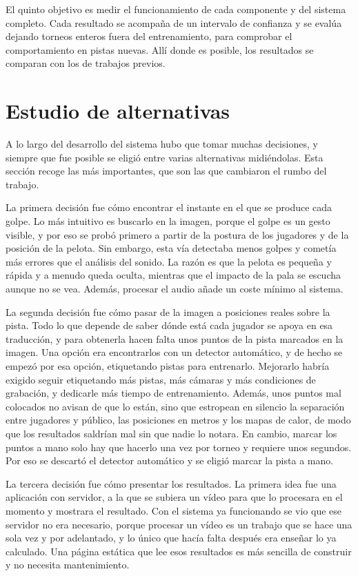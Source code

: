 El quinto objetivo es medir el funcionamiento de cada componente y del sistema completo.
Cada resultado se acompaña de un intervalo de confianza y se evalúa dejando torneos enteros fuera del entrenamiento, para comprobar el comportamiento en pistas nuevas.
Allí donde es posible, los resultados se comparan con los de trabajos previos.

\section{Estudio de alternativas}
\label{sec:alternativas}



A lo largo del desarrollo del sistema hubo que tomar muchas decisiones, y siempre que fue posible se eligió entre varias alternativas midiéndolas.
Esta sección recoge las más importantes, que son las que cambiaron el rumbo del trabajo.

La primera decisión fue cómo encontrar el instante en el que se produce cada golpe.
Lo más intuitivo es buscarlo en la imagen, porque el golpe es un gesto visible, y por eso se probó primero a partir de la postura de los jugadores y de la posición de la pelota.
Sin embargo, esta vía detectaba menos golpes y cometía más errores que el análisis del sonido.
La razón es que la pelota es pequeña y rápida y a menudo queda oculta, mientras que el impacto de la pala se escucha aunque no se vea.
Además, procesar el audio añade un coste mínimo al sistema.

La segunda decisión fue cómo pasar de la imagen a posiciones reales sobre la pista.
Todo lo que depende de saber dónde está cada jugador se apoya en esa traducción, y para obtenerla hacen falta unos puntos de la pista marcados en la imagen.
Una opción era encontrarlos con un detector automático, y de hecho se empezó por esa opción, etiquetando pistas para entrenarlo.
Mejorarlo habría exigido seguir etiquetando más pistas, más cámaras y más condiciones de grabación, y dedicarle más tiempo de entrenamiento.
Además, unos puntos mal colocados no avisan de que lo están, sino que estropean en silencio la separación entre jugadores y público, las posiciones en metros y los mapas de calor, de modo que los resultados saldrían mal sin que nadie lo notara.
En cambio, marcar los puntos a mano solo hay que hacerlo una vez por torneo y requiere unos segundos.
Por eso se descartó el detector automático y se eligió marcar la pista a mano.

La tercera decisión fue cómo presentar los resultados.
La primera idea fue una aplicación con servidor, a la que se subiera un vídeo para que lo procesara en el momento y mostrara el resultado.
Con el sistema ya funcionando se vio que ese servidor no era necesario, porque procesar un vídeo es un trabajo que se hace una sola vez y por adelantado, y lo único que hacía falta después era enseñar lo ya calculado.
Una página estática que lee esos resultados es más sencilla de construir y no necesita mantenimiento.

